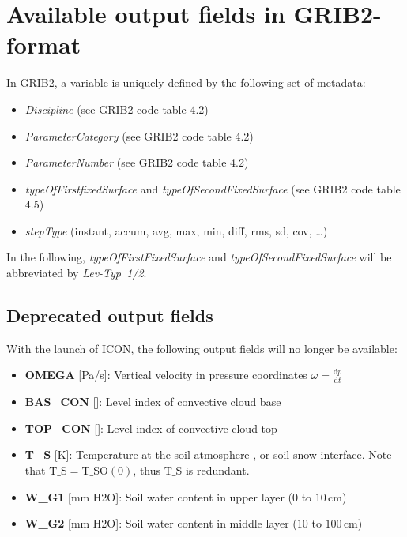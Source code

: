 \chapter{Available output fields in GRIB2-format}

\newcommand{\rb}[1]{\raisebox{4.0ex}[0pt]{#1}}

In GRIB2, a variable is uniquely defined by the following set of metadata:
\begin{itemize}
 \item \emph{Discipline} (see GRIB2 code table 4.2)
 \item \emph{ParameterCategory} (see GRIB2 code table 4.2)
 \item \emph{ParameterNumber} (see GRIB2 code table 4.2)
 \item \emph{typeOfFirstfixedSurface} and \emph{typeOfSecondFixedSurface} (see GRIB2 code table 4.5)
 \item \emph{stepType} (instant, accum, avg, max, min, diff, rms, sd, cov, \dots)
\end{itemize}
In the following, \emph{typeOfFirstFixedSurface} and \emph{typeOfSecondFixedSurface} will be abbreviated by \emph{Lev-Typ~1/2}.

\section{Deprecated output fields}
With the launch of ICON, the following output fields will no longer be available:

\begin{itemize}
 \item \textbf{OMEGA} [Pa/s]: Vertical velocity in pressure coordinates $\omega=\frac{\mathrm{d}p}{\mathrm{d}t}$
 \item \textbf{BAS\_CON} [\textendash]: Level index of convective cloud base
 \item \textbf{TOP\_CON} [\textendash]: Level index of convective cloud top
 \item \textbf{T\_S} [K]: Temperature at the soil-atmosphere-, or soil-snow-interface. Note that $\mathrm{T\_S} = \mathrm{T\_SO(0)}$, thus $\mathrm{T\_S}$ is redundant.
 \item \textbf{W\_G1} [mm H2O]: Soil water content in upper layer ($0$ to $10\,\mathrm{cm}$) 
 \item \textbf{W\_G2} [mm H2O]: Soil water content in middle layer ($10$ to $100\,\mathrm{cm}$)
\end{itemize}


